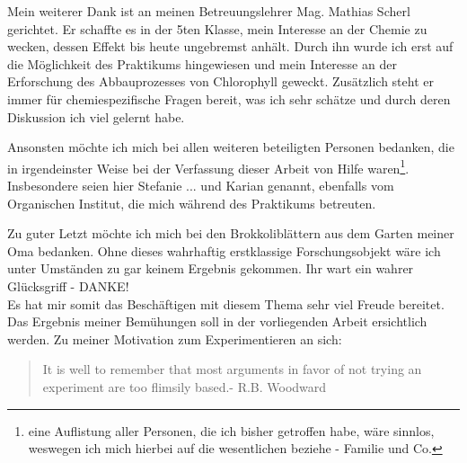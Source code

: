 Mein weiterer Dank ist an meinen Betreuungslehrer Mag. Mathias Scherl gerichtet. Er schaffte es in der 5ten Klasse, mein Interesse an der Chemie zu wecken, dessen Effekt bis heute ungebremst anhält. Durch ihn wurde ich erst auf die Möglichkeit des Praktikums hingewiesen und mein Interesse an der Erforschung des Abbauprozesses von Chlorophyll geweckt. Zusätzlich steht er immer für chemiespezifische Fragen bereit, was ich sehr schätze und durch deren Diskussion ich viel gelernt habe. 

Ansonsten möchte ich mich bei allen weiteren beteiligten Personen bedanken, die in irgendeinster Weise bei der Verfassung dieser Arbeit von Hilfe waren\footnote{eine Auflistung aller Personen, die ich bisher getroffen habe, wäre sinnlos, weswegen ich mich hierbei auf die wesentlichen beziehe - Familie und Co.}. Insbesondere seien hier Stefanie ... und Karian genannt, ebenfalls vom Organischen Institut, die mich während des Praktikums betreuten.  

Zu guter Letzt möchte ich mich bei den Brokkoliblättern aus dem Garten meiner Oma bedanken. Ohne dieses wahrhaftig erstklassige Forschungsobjekt wäre ich unter Umständen zu gar keinem Ergebnis gekommen. Ihr wart ein wahrer Glücksgriff - DANKE! \\

Es hat mir somit das Beschäftigen mit diesem Thema sehr viel Freude bereitet. Das Ergebnis meiner Bemühungen soll in der vorliegenden Arbeit ersichtlich werden. Zu meiner Motivation zum Experimentieren an sich: \\

\begin{quotation}
 \glqq It is well to remember that most arguments in favor of not trying an experiment are too flimsily based.\grqq - R.B. Woodward
 \end{quotation} 


